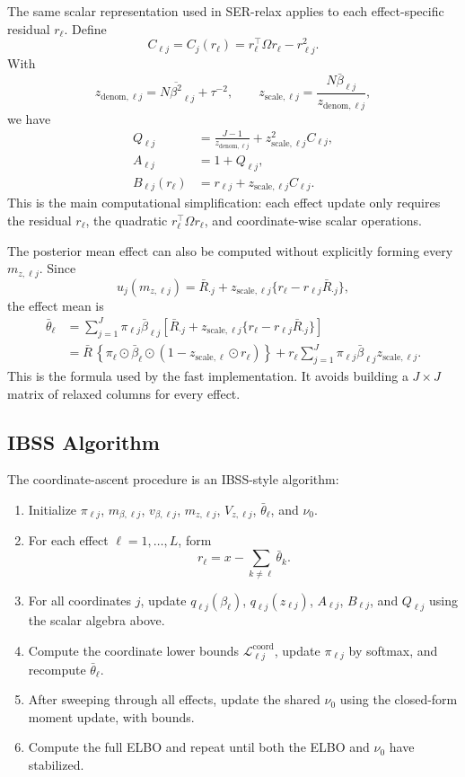 \documentclass[11pt]{article}
\newcommand{\Rbar}{\bar R}
\newcommand{\Om}{\Omega}
\begin{document}
The same scalar representation used in SER-relax applies to each
effect-specific residual \(r_\ell\). Define
\[
C_{\ell j}
=
C_j(r_\ell)
=
r_\ell^\top\Om r_\ell-r_{\ell j}^2.
\]
With
\[
z_{\mathrm{denom},\ell j}
=
N\overline{\beta^2}_{\ell j}+\tau^{-2},
\qquad
z_{\mathrm{scale},\ell j}
=
\frac{N\bar\beta_{\ell j}}
{z_{\mathrm{denom},\ell j}},
\]
we have
\begin{align}
Q_{\ell j}
&=
\frac{J-1}{z_{\mathrm{denom},\ell j}}
+z_{\mathrm{scale},\ell j}^2C_{\ell j},\\
A_{\ell j}&=1+Q_{\ell j},\\
B_{\ell j}(r_\ell)
&=
r_{\ell j}+z_{\mathrm{scale},\ell j}C_{\ell j}.
\end{align}
This is the main computational simplification: each effect update only
requires the residual \(r_\ell\), the quadratic
\(r_\ell^\top\Om r_\ell\), and coordinate-wise scalar operations.

The posterior mean effect can also be computed without explicitly
forming every \(m_{z,\ell j}\). Since
\[
u_j(m_{z,\ell j})
=
\Rbar_{\cdot j}
+z_{\mathrm{scale},\ell j}
\{r_\ell-r_{\ell j}\Rbar_{\cdot j}\},
\]
the effect mean is
\begin{align}
\bar\theta_\ell
&=
\sum_{j=1}^J
\pi_{\ell j}\bar\beta_{\ell j}
\left[
\Rbar_{\cdot j}
+z_{\mathrm{scale},\ell j}
\{r_\ell-r_{\ell j}\Rbar_{\cdot j}\}
\right] \nonumber\\
&=
\Rbar\,
\left\{
\pi_\ell\odot\bar\beta_\ell
\odot(1-z_{\mathrm{scale},\ell}\odot r_\ell)
\right\}
+
r_\ell
\sum_{j=1}^J
\pi_{\ell j}\bar\beta_{\ell j}z_{\mathrm{scale},\ell j}.
\end{align}
This is the formula used by the fast implementation. It avoids building
a \(J\times J\) matrix of relaxed columns for every effect.

\subsection{IBSS Algorithm}

The coordinate-ascent procedure is an IBSS-style algorithm:
\begin{enumerate}[leftmargin=*]
\item Initialize \(\pi_{\ell j}\), \(m_{\beta,\ell j}\),
\(v_{\beta,\ell j}\), \(m_{z,\ell j}\), \(V_{z,\ell j}\),
\(\bar\theta_\ell\), and \(\nu_0\).
\item For each effect \(\ell=1,\ldots,L\), form
\[
r_\ell=x-\sum_{k\ne\ell}\bar\theta_k.
\]
\item For all coordinates \(j\), update \(q_{\ell j}(\beta_\ell)\),
\(q_{\ell j}(z_{\ell j})\), \(A_{\ell j}\), \(B_{\ell j}\), and
\(Q_{\ell j}\) using the scalar algebra above.
\item Compute the coordinate lower bounds
\(\mathcal L_{\ell j}^{\mathrm{coord}}\), update
\(\pi_{\ell j}\) by softmax, and recompute \(\bar\theta_\ell\).
\item After sweeping through all effects, update the shared \(\nu_0\)
using the closed-form moment update, with bounds.
\item Compute the full ELBO and repeat until both the ELBO and \(\nu_0\)
have stabilized.
\end{enumerate}
\end{document}
